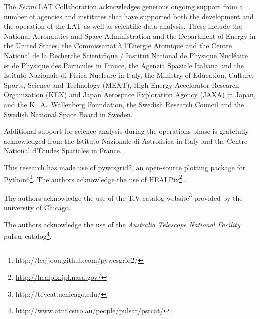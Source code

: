 The \textit{Fermi} LAT Collaboration acknowledges generous ongoing support
from a number of agencies and institutes that have supported both the
development and the operation of the LAT as well as scientific data analysis.
These include the National Aeronautics and Space Administration and the
Department of Energy in the United States, the Commissariat \`a l'Energie Atomique
and the Centre National de la Recherche Scientifique / Institut National de Physique
Nucl\'eaire et de Physique des Particules in France, the Agenzia Spaziale Italiana
and the Istituto Nazionale di Fisica Nucleare in Italy, the Ministry of Education,
Culture, Sports, Science and Technology (MEXT), High Energy Accelerator Research
Organization (KEK) and Japan Aerospace Exploration Agency (JAXA) in Japan, and
the K.~A.~Wallenberg Foundation, the Swedish Research Council and the
Swedish National Space Board in Sweden.

Additional support for science analysis during the operations phase is
gratefully acknowledged from the Istituto Nazionale di Astrofisica in
Italy and the Centre National d'\'Etudes Spatiales in France.

This research has made use of pywcsgrid2, an open-source plotting package for Python6\footnote{http://leejjoon.github.com/pywcsgrid2/}. The authors acknowledge the use of HEALPix\footnote{\url{http://healpix.jpl.nasa.gov/}} \citep{2005ApJ...622..759G}.

The authors acknowledge the use of the TeV catalog website\footnote{http://tevcat.uchicago.edu/} provided by the university of Chicago.

The authors acknowledge the use of the \emph{Australia Telescope National Facility} pulsar catalog\footnote{http://www.atnf.csiro.au/people/pulsar/psrcat/}.